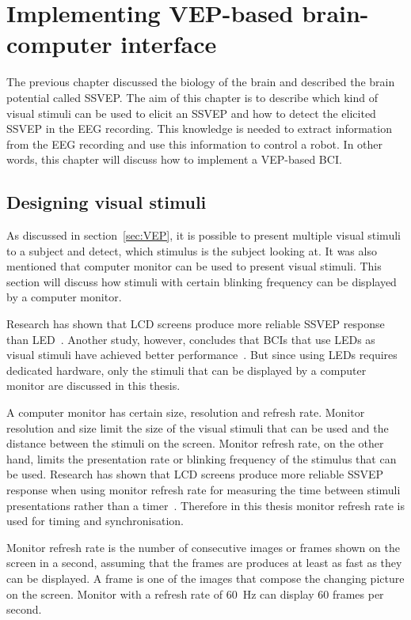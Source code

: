 
\chapter{Implementing VEP-based brain-computer interface}

The previous chapter discussed the biology of the brain and described the brain potential called \gls{SSVEP}. The aim of this chapter is to describe which kind of visual stimuli can be used to elicit an \gls{SSVEP} and how to detect the elicited \gls{SSVEP} in the \gls{EEG} recording. This knowledge is needed to extract information from the \gls{EEG} recording and use this information to control a robot. In other words, this chapter will discuss how to implement a \gls{VEP}-based \gls{BCI}.

\section{Designing visual stimuli}
\label{sec:stimuli}

As discussed in section~\ref{sec:VEP}, it is possible to present multiple visual stimuli to a subject and detect, which stimulus is the subject looking at. It was also mentioned that computer monitor can be used to present visual stimuli. This section will discuss how stimuli with certain blinking frequency can be displayed by a computer monitor.

Research has shown that LCD screens produce more reliable \gls{SSVEP} response than \gls{LED}~\cite{lcd_lcd_led}. Another study, however, concludes that \glspl{BCI} that use \glspl{LED} as visual stimuli have achieved better performance~\cite{ssvep_stim}. But since using \glspl{LED} requires dedicated hardware, only the stimuli that can be displayed by a computer monitor are discussed in this thesis.

A computer monitor has certain size, resolution and \gls{refresh rate}. Monitor resolution and size limit the size of the visual stimuli that can be used and the distance between the stimuli on the screen. Monitor \gls{refresh rate}, on the other hand, limits the presentation rate or blinking frequency of the stimulus that can be used. Research has shown that LCD screens produce more reliable \gls{SSVEP} response when using monitor \gls{refresh rate} for measuring the time between stimuli presentations rather than a timer~\cite{lcd_lcd_led}. Therefore in this thesis monitor \gls{refresh rate} is used for timing and synchronisation.

Monitor \gls{refresh rate} is the number of consecutive images or \glspl{frame} shown on the screen in a second, assuming that the \glspl{frame} are produces at least as fast as they can be displayed. A \gls{frame} is one of the images that compose the changing picture on the screen. Monitor with a \gls{refresh rate} of \SI{60}{Hz} can display 60 \glspl{frame} per second. 

